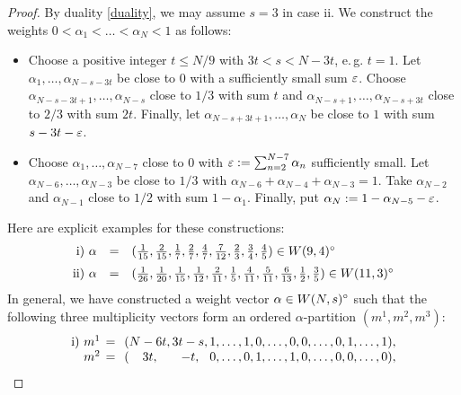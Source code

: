 \documentclass{article}
\begin{document}
\begin{proof}
  By duality \ref{duality}, we may assume $s=3$ in case ii. We construct the weights $0 < \alpha_1 < \ldots < \alpha_N < 1$ as follows:
  \begin{itemize}
   \item[i)] Choose a positive integer $t \leq N/9$ with $3t < s < N-3t$, e.\,g. $t=1$. Let $\alpha_1, \ldots, \alpha_{N-s-3t}$ be close to $0$ with a
    sufficiently small sum $\varepsilon$. Choose $\alpha_{N-s-3t+1}, \ldots, \alpha_{N-s}$ close to $1/3$ with sum $t$ and $\alpha_{N-s+1}, \ldots,
    \alpha_{N-s+3t}$ close to $2/3$ with sum $2t$. Finally, let $\alpha_{N-s+3t+1}, \ldots, \alpha_N$ be close to $1$ with sum $s-3t-\varepsilon$.
   \item[ii)] Choose $\alpha_1, \ldots, \alpha_{N-7}$ close to $0$ with $\varepsilon := \sum_{n=2}^{N-7} \alpha_n$ sufficiently small. Let $\alpha_{N-6}, \ldots,
    \alpha_{N-3}$ be close to $1/3$ with $\alpha_{N-6} + \alpha_{N-4} + \alpha_{N-3} = 1$. Take $\alpha_{N-2}$ and $\alpha_{N-1}$ close to $1/2$ with sum
    $1 - \alpha_1$. Finally, put $\alpha_N := 1 - \alpha_{N-5} - \varepsilon$.
  \end{itemize}
  Here are explicit examples for these constructions:
  \begin{displaymath} \begin{array}{rcl}
    \text{i) } \alpha & = &
      (\frac{1}{15}, \frac{2}{15}, \frac{1}{7}, \frac{2}{7}, \frac{4}{7}, \frac{7}{12}, \frac{2}{3}, \frac{3}{4}, \frac{4}{5}) \in \intW{9, 4} \medskip\\
    \text{ii) } \alpha & = &
      (\frac{1}{26}, \frac{1}{20}, \frac{1}{15}, \frac{1}{12}, \frac{2}{11}, \frac{1}{5}, \frac{4}{11}, \frac{5}{11}, \frac{6}{13}, \frac{1}{2},
       \frac{3}{5}) \in \intW{11, 3}
  \end{array} \end{displaymath}
  In general, we have constructed a weight vector $\alpha \in W(N, s)^{\circ}$ such that the following three multiplicity vectors form an ordered
  $\alpha$-partition $(m^1, m^2, m^3)$:
  \begin{displaymath}
    \begin{array}{r@{\hspace{1ex}=\hspace{1ex}(}c@{\,}c@{\,}l}
     \text{i) }
      m^1 & N-6t, & 3t-s, &             1,\ldots,1          ,             0,\ldots,0      ,             0,\ldots,0      ,             1,\ldots,1),\\
      m^2 &  3t,  &  -t,  &             0,\ldots,0          ,             1,\ldots,1      ,             0,\ldots,0      ,             0,\ldots,0),\\

\end{array}
\end{displaymath}
\end{proof}
\end{document}
